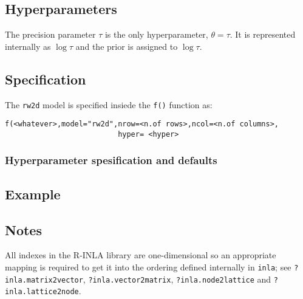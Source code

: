 \documentclass[a4paper,11pt]{article}
\begin{document}
\subsection*{Hyperparameters}

The precision parameter $\tau$ is the only hyperparameter, $\theta =
\tau$. It is represented internally as $\log\tau$ and the prior is
assigned to $\log\tau$.

\subsection*{Specification}

The {\tt rw2d} model is specified insiede the {\tt f()} function as:
\begin{verbatim}
f(<whatever>,model="rw2d",nrow=<n.of rows>,ncol=<n.of columns>,
                          hyper= <hyper>
\end{verbatim}

\subsubsection*{Hyperparameter spesification and defaults}


\subsection*{Example}



\subsection*{Notes}
All indexes in the R-INLA library are one-dimensional so an
appropriate mapping is required to get it into the ordering defined
internally in \verb|inla|; see \verb|?inla.matrix2vector|,
\verb|?inla.vector2matrix|, \verb|?inla.node2lattice| and
\verb|?inla.lattice2node|.

{\small}
\end{document}
